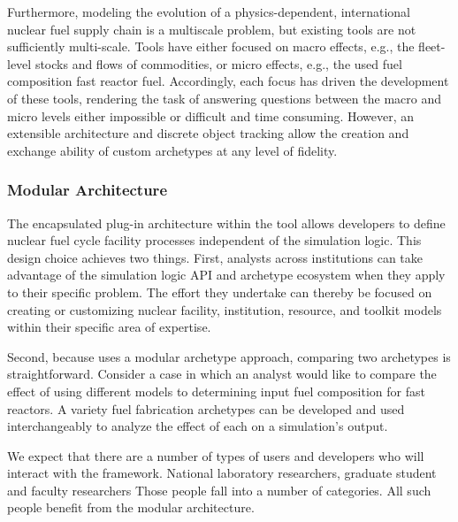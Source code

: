 Furthermore, modeling the evolution of a physics-dependent, international nuclear fuel supply
chain is a multiscale problem, but existing tools are not sufficiently 
multi-scale. Tools have either focused on macro effects, e.g., the fleet-level
stocks and flows of commodities, or micro effects, e.g., the used fuel
composition fast reactor fuel. Accordingly, each focus has driven the
development of these tools, rendering the task of answering questions between
the macro and micro levels either impossible or difficult and time consuming. 
However, an extensible architecture and discrete object tracking allow 
the creation and exchange ability of custom \Cyclus archetypes at any level of fidelity.

\subsubsection{Modular Architecture}

The encapsulated plug-in architecture within the \Cyclus tool allows developers 
to define nuclear fuel cycle facility processes independent of the simulation 
logic. This design choice achieves two things. First, analysts across 
institutions can take advantage of the simulation logic \gls{API} and 
archetype ecosystem when they apply \Cyclus to their specific problem. The effort they 
undertake can thereby be focused on creating or customizing 
nuclear facility, institution, resource, and toolkit models within their 
specific area of expertise.

Second, because \Cyclus uses a modular archetype approach, comparing two 
archetypes is straightforward. Consider a case in which an analyst would like 
to compare the effect of using different models to determining input fuel 
composition for fast reactors. A variety fuel fabrication archetypes can be 
developed and used interchangeably to analyze the effect of each on a 
simulation's output.

We expect that there are a number of types of users and developers who will 
interact with the \Cyclus framework. National laboratory researchers,
graduate student and faculty researchers  Those people fall into a number of 
categories. All such people benefit from the modular architecture. 

